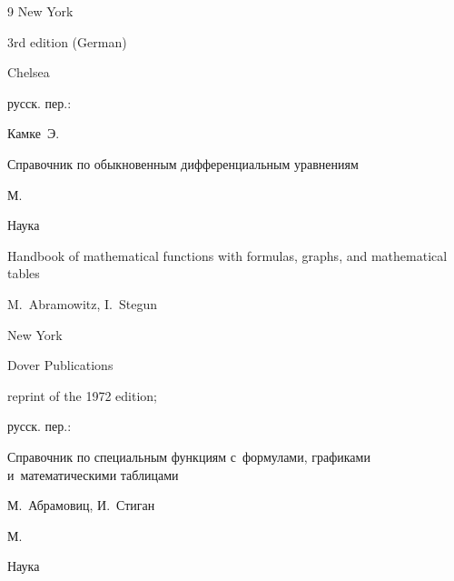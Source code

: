 \begin{thebibliography}{9}
\publaddr New York

\issueinfo 3rd edition (German)

\publ Chelsea



\rtransl русск. пер.:~

\by Камке~Э.

\book Справочник по обыкновенным дифференциальным уравнениям

\publaddr М.

\publ Наука






\book Handbook of mathematical functions with formulas, graphs, and mathematical tables 

\eds M.~Abramowitz, I.~Stegun

\publaddr New York

\publ Dover Publications

\issueinfo \nofrills reprint of the 1972 edition;



\rtransl русск. пер.:~

\book Справочник по специальным функциям с~формулами, графиками и~математическими таблицами

\eds М.~Абрамовиц, И.~Стиган 

\publaddr М.

\publ Наука





\end{thebibliography}



\noindent

\hskip6.5cm \thedate \par\noindent

\hskip6.5cm\therevdate\par









\makeengtitlem



\renewcommand{\baselinestretch}{0.9}

\newpage



%

